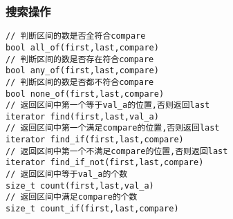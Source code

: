 \subsubsection{搜索操作}
\begin{lstlisting}
// 判断区间的数是否全符合compare
bool all_of(first,last,compare)
// 判断区间的数是否存在符合compare
bool any_of(first,last,compare)
// 判断区间的数是否都不符合compare
bool none_of(first,last,compare)
// 返回区间中第一个等于val_a的位置,否则返回last
iterator find(first,last,val_a)
// 返回区间中第一个满足compare的位置,否则返回last
iterator find_if(first,last,compare)
// 返回区间中第一个不满足compare的位置,否则返回last
iterator find_if_not(first,last,compare)
// 返回区间中等于val_a的个数
size_t count(first,last,val_a)
// 返回区间中满足compare的个数
size_t count_if(first,last,compare)
\end{lstlisting}
